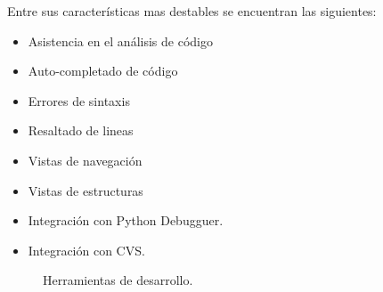 \documentclass[12pt]{book} %
\begin{document}
		Entre sus características mas destables se encuentran las siguientes:
		\begin{multicols}{2}
		\begin{itemize}
			\item Asistencia en el análisis de código
			\item Auto-completado de código
			\item Errores de sintaxis
			\item Resaltado de lineas
			\item Vistas de navegación
			\item Vistas de estructuras
			\item Integración con Python Debugguer.
			\item Integración con CVS.
		\end{itemize}
		\end{multicols}
		\begin{figure}[hbt]
			\centering
			\caption{Herramientas de desarrollo. \label{f-lenete-uml}}
		\end{figure}	
\end{document}
